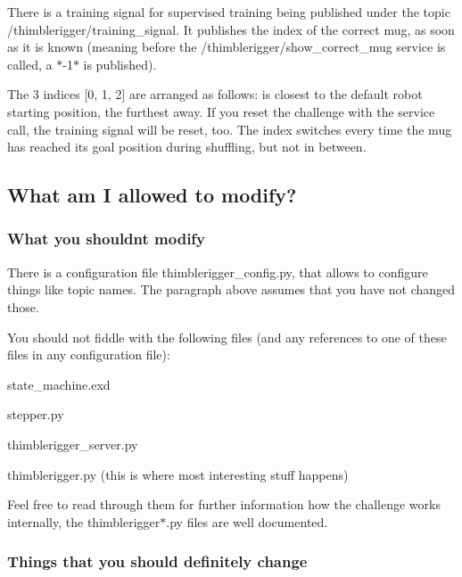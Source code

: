 There is a training signal for supervised training being published under the topic {\ttfamily /thimblerigger/training\+\_\+signal}. It publishes the index of the correct mug, as soon as it is known (meaning before the {\ttfamily /thimblerigger/show\+\_\+correct\+\_\+mug} service is called, a $\ast$-\/1$\ast$ is published).

The 3 indices {\ttfamily \mbox{[}0, 1, 2\mbox{]}} are arranged as follows\+: {} is closest to the default robot starting position, {} the furthest away. If you reset the challenge with the service call, the training signal will be reset, too. The index switches every time the mug has reached its goal position during shuffling, but not in between.

\subsection*{What am I allowed to modify?}

\subsubsection*{What you shouldn\textquotesingle{}t modify}

There is a configuration file {\ttfamily thimblerigger\+\_\+config.\+py}, that allows to configure things like topic names. The paragraph above assumes that you have not changed those.

You should not fiddle with the following files (and any references to one of these files in any configuration file)\+:


\begin{DoxyItemize}
\item {\ttfamily state\+\_\+machine.\+exd}
\item {\ttfamily stepper.\+py}
\item {\ttfamily thimblerigger\+\_\+server.\+py}
\item {\ttfamily thimblerigger.\+py} (this is where most interesting stuff happens)
\end{DoxyItemize}

Feel free to read through them for further information how the challenge works internally, the {\ttfamily thimblerigger$\ast$.py} files are well documented.

\subsubsection*{Things that you should definitely change}


